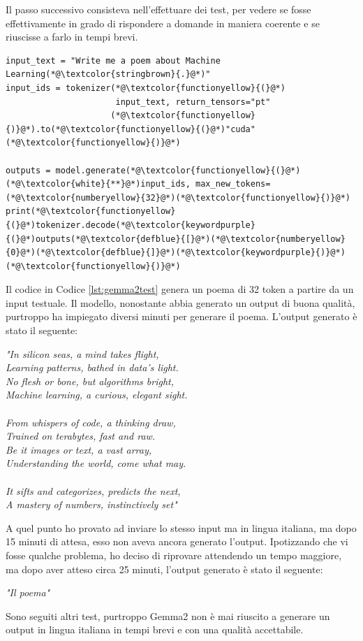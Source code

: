 Il passo successivo consisteva nell'effettuare dei test, per vedere se fosse effettivamente in grado di rispondere a domande in maniera coerente e se riuscisse a farlo in tempi brevi.
\begin{lstlisting}[label=lst:gemma2test, caption={Primo test di Gemma2}]
input_text = "Write me a poem about Machine Learning(*@\textcolor{stringbrown}{.}@*)"
input_ids = tokenizer(*@\textcolor{functionyellow}{(}@*)
                      input_text, return_tensors="pt"
                     (*@\textcolor{functionyellow}{)}@*).to(*@\textcolor{functionyellow}{(}@*)"cuda"(*@\textcolor{functionyellow}{)}@*)

outputs = model.generate(*@\textcolor{functionyellow}{(}@*)(*@\textcolor{white}{**}@*)input_ids, max_new_tokens=(*@\textcolor{numberyellow}{32}@*)(*@\textcolor{functionyellow}{)}@*)
print(*@\textcolor{functionyellow}{(}@*)tokenizer.decode(*@\textcolor{keywordpurple}{(}@*)outputs(*@\textcolor{defblue}{[}@*)(*@\textcolor{numberyellow}{0}@*)(*@\textcolor{defblue}{]}@*)(*@\textcolor{keywordpurple}{)}@*)(*@\textcolor{functionyellow}{)}@*)
\end{lstlisting}
Il codice in Codice \ref{lst:gemma2test} genera un poema di 32 token a partire da un input testuale. Il modello, nonostante abbia generato un output di buona qualità, purtroppo ha impiegato diversi minuti per generare il poema. L'output generato è stato il seguente:
\begin{center}
    \textit{"In silicon seas, a mind takes flight,} \\
    \textit{Learning patterns, bathed in data's light.} \\
    \textit{No flesh or bone, but algorithms bright,} \\
    \textit{Machine learning, a curious, elegant sight.} \\
    \textit{} \\
    \textit{From whispers of code, a thinking draw,} \\
    \textit{Trained on terabytes, fast and raw.} \\
    \textit{Be it images or text, a vast array,} \\
    \textit{Understanding the world, come what may.} \\
    \textit{} \\
    \textit{It sifts and categorizes, predicts the next,} \\
    \textit{A mastery of numbers, instinctively set"}
\end{center}
A quel punto ho provato ad inviare lo stesso input ma in lingua italiana, ma dopo 15 minuti di attesa, esso non aveva ancora generato l'output. Ipotizzando che vi fosse qualche problema, ho deciso di riprovare attendendo un tempo maggiore, ma dopo aver atteso circa 25 minuti, l'output generato è stato il seguente:
\begin{center}
    \textit{"Il poema"}
\end{center}
Sono seguiti altri test, purtroppo Gemma2 non è mai riuscito a generare un output in lingua italiana in tempi brevi e con una qualità accettabile.

